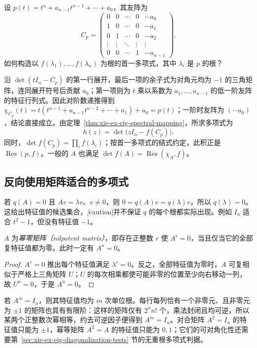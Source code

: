 \begin{example}
设 $p(t)=t^n+a_{n-1}t^{n-1}+\cdots+a_0$，其友阵为
\[
C_p=\begin{pmatrix}
0&0&\cdots&0&-a_0\\
1&0&\cdots&0&-a_1\\
0&1&\cdots&0&-a_2\\
\vdots&\vdots&\ddots&\vdots&\vdots\\
0&0&\cdots&1&-a_{n-1}
\end{pmatrix}.
\]
如何构造以 $f(\lambda_1),\ldots,f(\lambda_n)$ 为根的首一多项式，其中 $\lambda_i$ 是 $p$ 的根？
\end{example}
\begin{solve}
沿 $\det(tI_n-C_p)$ 的第一行展开，最后一项的余子式为对角元均为 $-1$ 的三角矩阵，连同展开符号后贡献 $a_0$；第一项则为 $t$ 乘以系数为 $a_1,\ldots,a_{n-1}$ 的低一阶友阵的特征行列式。因此对阶数递推得到 $\chi_{C_p}(t)=t(t^{n-1}+a_{n-1}t^{n-2}+\cdots+a_1)+a_0=p(t)$；一阶时友阵为 $(-a_0)$，结论直接成立。由定理~\ref{thm:xie-ex-eig-spectral-mapping}，所求多项式为
\[
h(z)=\det\bigl(zI_n-f(C_p)\bigr).
\]
同时，$\det f(C_p)=\prod_i f(\lambda_i)$；按首一多项式的结式约定，此积正是 $\operatorname{Res}(p,f)$。一般的 $A$ 也满足 $\det f(A)=\operatorname{Res}(\chi_A,f)$。
\end{solve}

\subsection{反向使用矩阵适合的多项式}

若 $q(A)=0$ 且 $Av=\lambda v$、$v\ne0$，则 $0=q(A)v=q(\lambda)v$，所以 $q(\lambda)=0$。这给出特征值的候选集合，\emph[caution]{并不保证 $q$ 的每个根都实际出现}。例如 $I_n$ 适合 $t^2-1$，但没有特征值 $-1$。

\begin{proposition}
\label{prop:xie-ex-eig-nilpotent-spectrum}
$A$ 为\emph{幂零矩阵（nilpotent matrix）}，即存在正整数 $r$ 使 $A^r=0$，当且仅当它的全部复特征值都为零。此时一定有 $A^n=0$。
\end{proposition}
\begin{proof}
$A^r=0$ 推出每个特征值满足 $\lambda^r=0$。反之，全部特征值为零时，$A$ 可复相似于严格上三角矩阵 $U$；$U$ 的每次相乘都使可能非零的位置至少向右移动一列，故 $U^n=0$，于是 $A^n=0$。
\end{proof}

若 $A^m=I_n$，则其特征值均为 $m$ 次单位根。每行每列恰有一个非零元、且非零元为 $\pm1$ 的矩阵也具有有限阶：这样的矩阵仅有 $2^nn!$ 个，乘法封闭且均可逆，所以某两个正整数次幂相等，约去可逆因子便得到 $A^m=I_n$。对合矩阵 $A^2=I_n$ 的特征值只能为 $\pm1$，幂等矩阵 $A^2=A$ 的特征值只能为 $0,1$；它们的可对角化性还需要第~\ref{sec:xie-ex-eig-diagonalization-tests} 节的无重根多项式判据。

